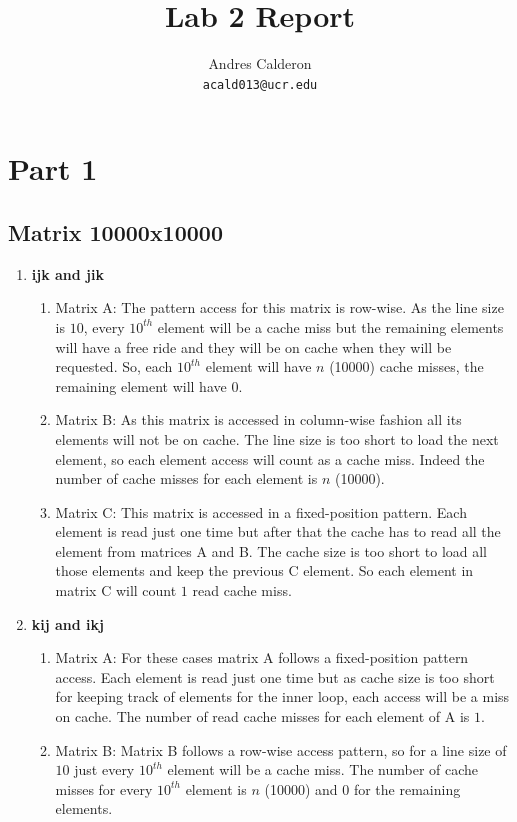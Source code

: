 \documentclass[10pt]{scrartcl}
\title{Lab 2 Report}
\author{
   Andres Calderon\\
  \small \texttt{acald013@ucr.edu}
}
\begin{document}
\maketitle

\section{Part 1}
\subsection{Matrix 10000x10000}
\begin{enumerate}
 \item \textbf{ijk and jik}
 \begin{enumerate}
  \item Matrix A: The pattern access for this matrix is row-wise.  As the line size is $10$, every $10^{th}$ element will be a cache miss but the remaining elements will have a free ride and they will be on cache when they will be requested.  So, each $10^{th}$ element will have $n$ (10000) cache misses, the remaining element will have $0$.
  \item Matrix B: As this matrix is accessed in column-wise fashion all its elements will not be on cache.  The line size is too short to load the next element, so each element access will count as a cache miss.  Indeed the number of cache misses for each element is $n$ (10000).
  \item Matrix C: This matrix is accessed in a fixed-position pattern.  Each element is read just one time but after that the cache has to read all the element from matrices A and B.  The cache size is too short to load all those elements and keep the previous C element.  So each element in matrix C will count $1$ read cache miss.
 \end{enumerate}
 \item \textbf{kij and ikj}
 \begin{enumerate}
  \item Matrix A: For these cases matrix A follows a fixed-position pattern access.  Each element is read just one time but as cache size is too short for keeping track of elements for the inner loop, each access will be a miss on cache.  The number of read cache misses for each element of A is $1$.
  \item Matrix B: Matrix B follows a row-wise access pattern, so for a line size of $10$ just every $10^{th}$ element will be a cache miss.  The number of cache misses for every $10^{th}$ element is $n$ (10000) and $0$ for the remaining elements. 

\end{enumerate}
\end{enumerate}
\end{document}
